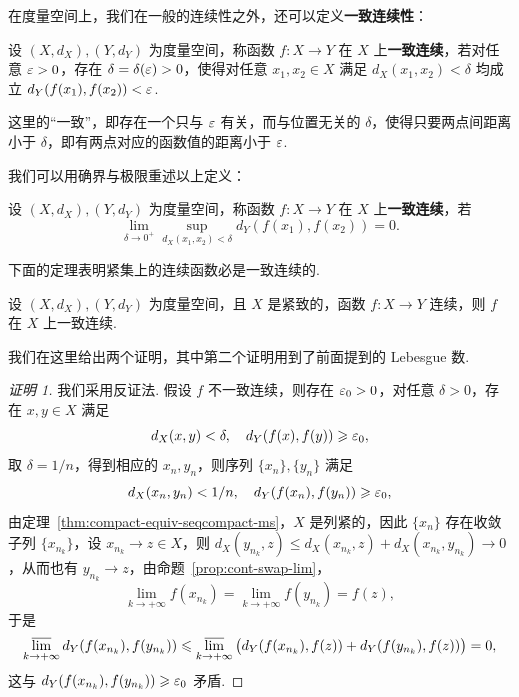 \documentclass[../main.tex]{subfiles}
\begin{document}
在度量空间上，我们在一般的连续性之外，还可以定义\textbf{一致连续性}：

\begin{definition}[一致连续的定义]
    设 $(X, d_X), (Y, d_Y)$ 为度量空间，称函数 $f:X \to Y$ 在 $X$ 上\textbf{一致连续}，若对任意 $\varepsilon > 0$，存在 $\delta = \delta(\varepsilon) > 0$，使得对任意 $x_1, x_2 \in X$ 满足 $d_X(x_1, x_2) < \delta$ 均成立 $d_Y(f(x_1), f(x_2)) < \varepsilon$. 
\end{definition}

这里的“一致”，即存在一个只与 $\varepsilon$ 有关，而与位置无关的 $\delta$，使得只要两点间距离小于 $\delta$，即有两点对应的函数值的距离小于 $\varepsilon$. 

我们可以用确界与极限重述以上定义：

\begin{definition}[一致连续的定义的重述]
    设 $(X, d_X), (Y, d_Y)$ 为度量空间，称函数 $f:X \to Y$ 在 $X$ 上\textbf{一致连续}，若 
    $$
    \lim_{\delta \to 0^+} \sup_{d_X(x_1, x_2) < \delta} d_Y(f(x_1), f(x_2)) = 0. 
    $$
\end{definition}

下面的定理表明紧集上的连续函数必是一致连续的. 

\begin{theorem} \label{thm:Heine-Cantor} 
    设 $(X, d_X), (Y, d_Y)$ 为度量空间，且 $X$ 是紧致的，函数 $f:X \to Y$ 连续，则 $f$ 在 $X$ 上一致连续. 
\end{theorem}

我们在这里给出两个证明，其中第二个证明用到了前面提到的 Lebesgue 数. 

\begin{proof}[证明 1]
    我们采用反证法. 假设 $f$ 不一致连续，则存在 $\varepsilon_0 > 0$，对任意 $\delta > 0$，存在 $x, y \in X$ 满足 
    $$
    d_X(x, y) < \delta,\quad d_Y(f(x), f(y)) \geqslant \varepsilon_0, 
    $$
    取 $\delta = 1 / n$，得到相应的 $x_n, y_n$，则序列 $\{x_n\}, \{y_n\}$ 满足 
    $$
    d_X(x_n, y_n) < 1 / n,\quad d_Y(f(x_n), f(y_n)) \geqslant \varepsilon_0, 
    $$
    由定理~\ref{thm:compact-equiv-seqcompact-ms}，$X$ 是列紧的，因此 $\{x_n\}$ 存在收敛子列 $\{x_{n_k}\}$，设 $x_{n_k} \to z \in X$，则 $d_X(y_{n_k}, z) \leqslant d_X(x_{n_k}, z) + d_X(x_{n_k}, y_{n_k}) \to 0$，从而也有 $y_{n_k} \to z$，由命题~\ref{prop:cont-swap-lim}，
    $$
    \lim_{k \to +\infty} f(x_{n_k}) = \lim_{k \to +\infty} f(y_{n_k}) = f(z), 
    $$
    于是
    \begin{align*}
        \varlimsup_{k \to +\infty} d_Y(f(x_{n_k}), f(y_{n_k})) \leqslant \varlimsup_{k \to +\infty} \big( d_Y(f(x_{n_k}), f(z)) + d_Y(f(y_{n_k}), f(z)) \big) = 0, 
    \end{align*}
    这与 $d_Y(f(x_{n_k}), f(y_{n_k})) \geqslant \varepsilon_0$ 矛盾. 
\end{proof}
\end{document}
